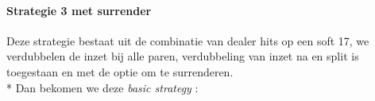\documentclass[conference]{IEEEtran}
\begin{document}
\newpage

\paragraph{Strategie 3 met surrender}

Deze strategie bestaat uit de combinatie van dealer hits op een soft 17, we verdubbelen de inzet bij alle paren, verdubbeling van inzet na en split is toegestaan en met de optie om te surrenderen.\\*
Dan bekomen we deze \textit{basic strategy} :

\begin{table}[ht]
\tiny
\centering
\begin{tabular}{|l|l|l|l|l|l|l|l|l|l|l|}
\hline


\end{tabular}
\end{table}
\end{document}
